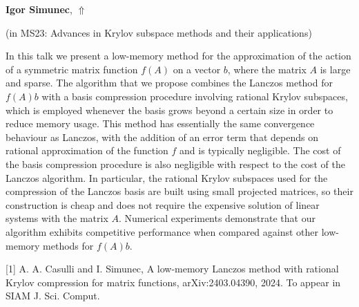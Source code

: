 \documentclass[ILAS2025-program.tex]{subfiles}
\begin{document}
\hypertarget{down0237}{}\begin{ilasabstract}
    
\textbf{Igor Simunec},  \hfill \hyperlink{up0237}{$\Uparrow$}
    
    
(in {\color{mstitle}MS23: Advances in Krylov subspace methods and their applications})
        
\mtskip
    In this talk we present a low-memory method for the approximation of the action of a symmetric matrix function $f(A)$ on a vector $b$, where the matrix $A$ is large and sparse. 
The algorithm that we propose combines the Lanczos method for $f(A) b$ with a basis compression procedure involving rational Krylov subspaces, which is employed whenever the basis grows beyond a certain size in order to reduce memory usage. 
This method has essentially the same convergence behaviour as Lanczos, with the addition of an error term that depends on rational approximation of the function $f$ and is typically negligible. 
The cost of the basis compression procedure is also negligible with respect to the cost of the Lanczos algorithm. In particular, the rational Krylov subspaces used for the compression of the Lanczos basis are built using small projected matrices, so their construction is cheap and does not require the expensive solution of linear systems with the matrix $A$. 
Numerical experiments demonstrate that our algorithm exhibits competitive performance when compared against other low-memory methods for $f(A) b$.

[1] A. A. Casulli and I. Simunec, A low-memory Lanczos method with rational Krylov compression for matrix functions, arXiv:2403.04390, 2024. To appear in SIAM J. Sci. Comput.

\end{ilasabstract}
    
\end{document}
